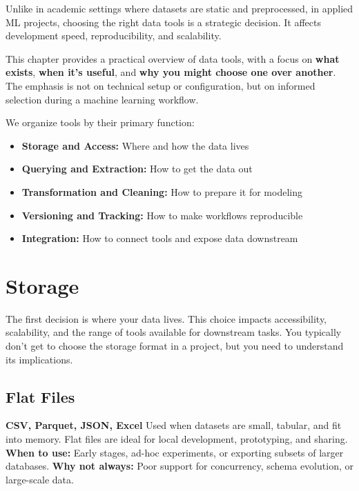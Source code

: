 \documentclass[12pt,openany]{book}
\begin{document}
Unlike in academic settings where datasets are static and preprocessed, in applied ML projects, choosing the right data tools is a strategic decision. It affects development speed, reproducibility, and scalability. \newline

This chapter provides a practical overview of data tools, with a focus on \textbf{what exists}, \textbf{when it’s useful}, and \textbf{why you might choose one over another}. The emphasis is not on technical setup or configuration, but on informed selection during a machine learning workflow. \newline

We organize tools by their primary function:
\begin{itemize}
    \item \textbf{Storage and Access:} Where and how the data lives
    \item \textbf{Querying and Extraction:} How to get the data out
    \item \textbf{Transformation and Cleaning:} How to prepare it for modeling
    \item \textbf{Versioning and Tracking:} How to make workflows reproducible
    \item \textbf{Integration:} How to connect tools and expose data downstream
\end{itemize}



\section{Storage}

The first decision is where your data lives. This choice impacts accessibility, scalability, and the range of tools available for downstream tasks. You typically don’t get to choose the storage format in a project, but you need to understand its implications.

\subsection*{Flat Files}

\textbf{CSV, Parquet, JSON, Excel} \newline
Used when datasets are small, tabular, and fit into memory. Flat files are ideal for local development, prototyping, and sharing. \newline
\textbf{When to use:} Early stages, ad-hoc experiments, or exporting subsets of larger databases. \newline
\textbf{Why not always:} Poor support for concurrency, schema evolution, or large-scale data.
\end{document}
